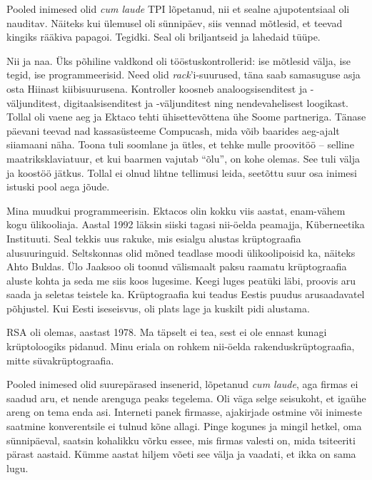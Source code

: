 Pooled inimesed olid \emph{cum laude} TPI lõpetanud, nii et sealne 
ajupotentsiaal oli nauditav. Näiteks kui ülemusel oli sünnipäev, siis
vennad mõtlesid, et teevad kingiks rääkiva papagoi. Tegidki. Seal oli 
briljantseid ja lahedaid tüüpe. 


Nii ja naa. Üks põhiline valdkond oli 
tööstuskontrollerid: ise mõtlesid välja, ise tegid, ise programmeerisid. Need olid 
\emph{rack}'i-suurused, täna saab samasuguse asja osta Hiinast 
kiibisuurusena. Kontroller koosneb analoogsisenditest ja 
-väljunditest, digitaalsisenditest ja -väljunditest ning nendevahelisest 
loogikast. 
Tollal oli vaene aeg ja Ektaco tehti ühisettevõttena ühe Soome partneriga. Tänase 
päevani teevad nad kassasüsteeme Compucash, mida võib 
baarides aeg-ajalt siiamaani näha. Toona tuli soomlane ja ütles, et tehke mulle 
proovitöö – selline maatriksklaviatuur, et kui baarmen vajutab \enquote{õlu}, on 
kohe olemas. See tuli välja ja koostöö jätkus. Tollal ei olnud lihtne 
tellimusi leida, seetõttu suur osa
inimesi istuski pool aega jõude. 


Mina muudkui programmeerisin. Ektacos olin kokku viis aastat, enam-vähem kogu
ülikooliaja. Aastal 1992 läksin siiski tagasi
nii-öelda peamajja, Küberneetika Instituuti. Seal tekkis uus rakuke, mis esialgu alustas krüptograafia alusuuringuid. Seltskonnas 
olid mõned teadlase moodi ülikoolipoisid ka, näiteks Ahto Buldas. Ülo Jaaksoo oli 
toonud välismaalt paksu raamatu krüptograafia aluste kohta ja seda me siis koos 
lugesime. Keegi luges peatüki läbi, proovis aru saada ja seletas 
teistele ka. Krüptograafia kui teadus Eestis puudus arusaadavatel põhjustel. Kui Eesti
iseseisvus, oli plats lage ja kuskilt pidi alustama.


RSA oli olemas, aastast 1978. Ma täpselt ei tea, sest ei ole ennast 
kunagi krüptoloogiks pidanud. Minu eriala on rohkem nii-öelda 
rakenduskrüptograafia, mitte süvakrüptograafia.


Pooled inimesed olid suurepärased insenerid, lõpetanud \emph{cum laude}, aga firmas ei saadud aru, et nende arenguga peaks tegelema. 
Oli väga selge seisukoht, et igaühe areng on tema enda asi. 
Interneti panek firmasse, ajakirjade ostmine või 
inimeste saatmine konverentsile ei tulnud kõne allagi. Pinge 
kogunes ja mingil hetkel, oma sünnipäeval, saatsin kohalikku võrku essee, mis firmas valesti on, mida tsiteeriti
pärast aastaid. Kümme aastat hiljem võeti see välja ja vaadati, et ikka on sama lugu. 

